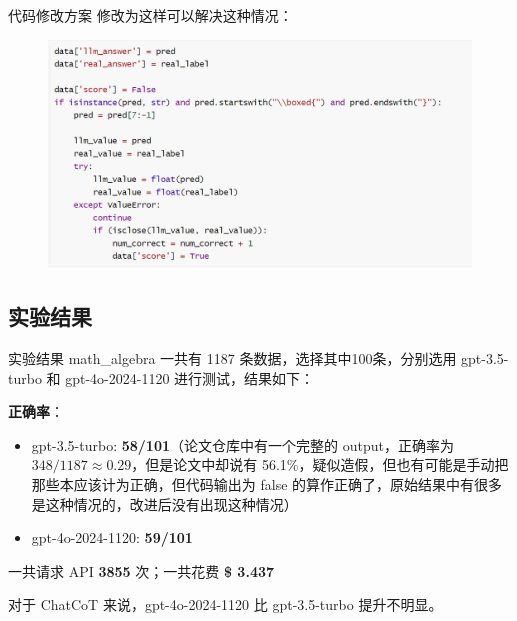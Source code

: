 \begin{frame}{代码修改方案}
    修改为这样可以解决这种情况：
    
    
    
    \begin{figure}
        \centering
        \includegraphics[width=.7\linewidth]{./pic/6.png}
    \end{figure}
\end{frame}

\subsection{实验结果}

\begin{frame}{实验结果}
    math\_algebra 一共有 1187 条数据，选择其中100条，分别选用 gpt-3.5-turbo 和 gpt-4o-2024-1120 进行测试，结果如下：
    
    \textbf{正确率}：
    \begin{itemize}
        \item gpt-3.5-turbo:  \textbf{58/101}（论文仓库中有一个完整的 output，正确率为 $348/1187 \approx 0.29$，但是论文中却说有 56.1\%，疑似造假，但也有可能是手动把那些本应该计为正确，但代码输出为 false 的算作正确了，原始结果中有很多是这种情况的，改进后没有出现这种情况）
        \item gpt-4o-2024-1120: \textbf{59/101}
    \end{itemize}
    
    一共请求 API \textbf{3855} 次；一共花费 \textbf{\$ 3.437}
    
    对于 ChatCoT 来说，gpt-4o-2024-1120 比 gpt-3.5-turbo 提升不明显。
\end{frame}
